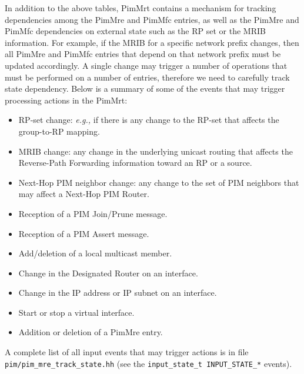 \documentclass[11pt]{article}
\newcommand{\eg}{\emph{e.g.,}\xspace}
\begin{document}
In addition to the above tables, PimMrt contains a mechanism for
tracking dependencies among the PimMre and PimMfc entries, as well as
the PimMre and PimMfc dependencies on external state such as the RP set
or the MRIB information. For example, if the MRIB for a specific network
prefix changes, then all PimMre and PimMfc entries that depend on that
network prefix must be updated accordingly. A single change may trigger
a number of operations that must be performed on a number of entries,
therefore we need to carefully track state dependency. Below is a
summary of some of the events that may trigger processing actions in the
PimMrt:

\begin{itemize}

  \item RP-set change: \eg if there is any change to the RP-set that
  affects the group-to-RP mapping.

  \item MRIB change: any change in the underlying unicast routing that
  affects the Reverse-Path Forwarding information toward an RP or a
  source.

  \item Next-Hop PIM neighbor change: any change to the set of PIM
  neighbors that may affect a Next-Hop PIM Router.

  \item Reception of a PIM Join/Prune message.

  \item Reception of a PIM Assert message.

  \item Add/deletion of a local multicast member.

  \item Change in the Designated Router on an interface.

  \item Change in the IP address or IP subnet on an interface.

  \item Start or stop a virtual interface.

  \item Addition or deletion of a PimMre entry.

\end{itemize}

A complete list of all input events that may trigger actions is in file
\verb=pim/pim_mre_track_state.hh= (see the
\verb=input_state_t INPUT_STATE_*= events).
\end{document}
